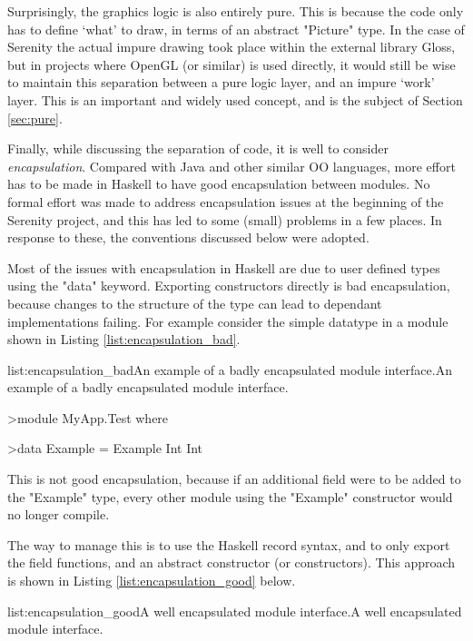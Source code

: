Surprisingly, the graphics logic is also entirely pure. This is because the code only has to define `what' to draw, in terms of an abstract "Picture" type. In the case of Serenity the actual impure drawing took place within the external library Gloss, but in projects where OpenGL (or similar) is used directly, it would still be wise to maintain this separation between a pure logic layer, and an impure `work' layer. This is an important and widely used concept, and is the subject of Section \ref{sec:pure}.

Finally, while discussing the separation of code, it is well to consider \emph{encapsulation}. Compared with Java and other similar OO languages, more effort has to be made in Haskell to have good encapsulation between modules. No formal effort was made to address encapsulation issues at the beginning of the Serenity project, and this has led to some (small) problems in a few places. In response to these, the conventions discussed below were adopted.

Most of the issues with encapsulation in Haskell are due to user defined types using the "data" keyword. Exporting constructors directly is bad encapsulation, because changes to the structure of the type can lead to dependant implementations failing. For example consider the simple datatype in a module shown in Listing \ref{list:encapsulation_bad}.

\vspace{-0.5em}
\begin{listing}{list:encapsulation_bad}{An example of a badly encapsulated module interface.}{An example of a badly encapsulated module interface.}{}
\end{listing}\vspace{-1.5em}

\begin{haskell}
>module MyApp.Test where

>data Example = Example Int Int

\end{haskell}
\noindent
This is not good encapsulation, because if an additional field were to be added to the "Example" type, every other module using the "Example" constructor would no longer compile. 

The way to manage this is to use the Haskell record syntax, and to only export the field functions, and an abstract constructor (or constructors). This approach is shown in Listing \ref{list:encapsulation_good} below.

\vspace{-0.5em}
\begin{listing}{list:encapsulation_good}{A well encapsulated module interface.}{A well encapsulated module interface.}{}
\end{listing}\vspace{-1.5em}

